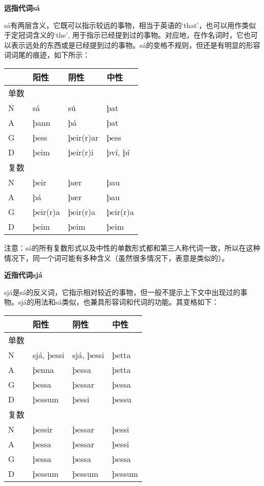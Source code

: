 \textbf{远指代词sá}

sá有两层含义，它既可以指示较远的事物，相当于英语的`that‌'，也可以用作类似于定冠词含义的`the‌',
用于指示已经提到过的事物。对应地，在作名词时，它也可以表示远处的东西或是已经提到过的事物。sá的变格不规则，但还是有明显的形容词词尾的痕迹，如下所示：

\begin{longtable}{llll}
\toprule
 & 阳性 & 阴性 & 中性 \\
\midrule
\endhead
\bottomrule
\endfoot
单数 & & & \\
N & sá & sú & þat \\
A & þann & þá & þat \\
G & þess & þeir(r)ar & þess \\
D & þeim & þeir(r)i & því, þí \\
复数 & & & \\
N & þeir & þær & þau \\
A & þá & þær & þau \\
G & þeir(r)a & þeir(r)a & þeir(r)a \\
D & þeim & þeim & þeim \\
\end{longtable}

注意：sá的所有复数形式以及中性的单数形式都和第三人称代词一致，所以在这种情况下，同一个词可能有多种含义（虽然很多情况下，表意是类似的）。

\textbf{近指代词sjá}

sjá是sá的反义词，它指示相对较近的事物，但一般不提示上下文中出现过的事物。sjá的用法和sá类似，也兼具形容词和代词的功能。其变格如下：

\begin{longtable}{llll}
\toprule
 & 阳性 & 阴性 & 中性 \\
\midrule
\endhead
\bottomrule
\endfoot
单数 & & & \\
N & sjá, þessi & sjá, þessi & þetta \\
A & þenna & þessa & þetta \\
G & þessa & þessar & þessa \\
D & þessum & þessi & þessu \\
复数 & & & \\
N & þessir & þessar & þessi \\
A & þessa & þessar & þessi \\
G & þessa & þessa & þessa \\
D & þessum & þessum & þessum \\
\end{longtable}

